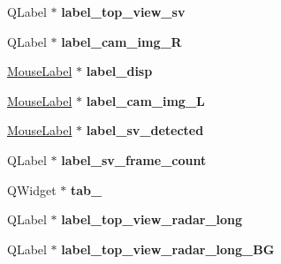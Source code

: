 \begin{DoxyCompactItemize}
\item 
\hypertarget{class_ui___main_window_ad237ddfde4cbe816a36ca9a4d089bc09}{}Q\+Label $\ast$ {\bfseries label\+\_\+top\+\_\+view\+\_\+sv}\label{class_ui___main_window_ad237ddfde4cbe816a36ca9a4d089bc09}

\item 
\hypertarget{class_ui___main_window_aaff386bcb60eb8ef7f8335b5c137bb1c}{}Q\+Label $\ast$ {\bfseries label\+\_\+cam\+\_\+img\+\_\+\+R}\label{class_ui___main_window_aaff386bcb60eb8ef7f8335b5c137bb1c}

\item 
\hypertarget{class_ui___main_window_a4ee2339c013c3c08a97f4ba514ad64e4}{}\hyperlink{class_mouse_label}{Mouse\+Label} $\ast$ {\bfseries label\+\_\+disp}\label{class_ui___main_window_a4ee2339c013c3c08a97f4ba514ad64e4}

\item 
\hypertarget{class_ui___main_window_a4607060872a6e254df4f91d93b32769b}{}\hyperlink{class_mouse_label}{Mouse\+Label} $\ast$ {\bfseries label\+\_\+cam\+\_\+img\+\_\+\+L}\label{class_ui___main_window_a4607060872a6e254df4f91d93b32769b}

\item 
\hypertarget{class_ui___main_window_a59e43dded72c952e66a10ee17fb3a652}{}\hyperlink{class_mouse_label}{Mouse\+Label} $\ast$ {\bfseries label\+\_\+sv\+\_\+detected}\label{class_ui___main_window_a59e43dded72c952e66a10ee17fb3a652}

\item 
\hypertarget{class_ui___main_window_a8492f118ee3c39459c458d802fcef8af}{}Q\+Label $\ast$ {\bfseries label\+\_\+sv\+\_\+frame\+\_\+count}\label{class_ui___main_window_a8492f118ee3c39459c458d802fcef8af}

\item 
\hypertarget{class_ui___main_window_a193f7d89d896d9369f4a1173de796fd1}{}Q\+Widget $\ast$ {\bfseries tab\+\_}\label{class_ui___main_window_a193f7d89d896d9369f4a1173de796fd1}

\item 
\hypertarget{class_ui___main_window_a45e03fdf49983c144b517119ac3a440b}{}Q\+Label $\ast$ {\bfseries label\+\_\+top\+\_\+view\+\_\+radar\+\_\+long}\label{class_ui___main_window_a45e03fdf49983c144b517119ac3a440b}

\item 
\hypertarget{class_ui___main_window_abdd13cb702c8cb09a43f62bf38520f9d}{}Q\+Label $\ast$ {\bfseries label\+\_\+top\+\_\+view\+\_\+radar\+\_\+long\+\_\+\+B\+G}\label{class_ui___main_window_abdd13cb702c8cb09a43f62bf38520f9d}


\end{DoxyCompactItemize}

